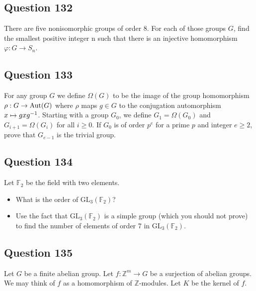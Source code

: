 \documentclass[12pt]{article}
\begin{document}
\hypertarget{question-132}{%
\subsection{Question 132}\label{question-132}}

There are five nonisomorphic groups of order 8. For each of those groups
\(G\), find the smallest positive integer n such that there is an
injective homomorphism \(\varphi: G\rightarrow S_n\).

\hypertarget{question-133}{%
\subsection{Question 133}\label{question-133}}

For any group \(G\) we define \(\Omega(G)\) to be the image of the group
homomorphism \(\rho:G\rightarrow{\text{Aut}}(G)\) where \(\rho\) maps \(g\in G\)
to the conjugation automorphism \(x\mapsto gxg^{-1}\). Starting with a
group \(G_0\), we define \(G_1=\Omega(G_0)\) and \(G_{i+1}=\Omega(G_i)\)
for all \(i\geq 0\). If \(G_0\) is of order \(p^e\) for a prime \(p\)
and integer \(e\geq 2\), prove that \(G_{e-1}\) is the trivial group.

\hypertarget{question-134}{%
\subsection{Question 134}\label{question-134}}

Let \(\mathbb F_2\) be the field with two elements.

\begin{itemize}
\item
  What is the order of \(\text{GL}_3(\mathbb F_2)\)?
\item
  Use the fact that \(\text{GL}_3(\mathbb F_2)\) is a simple group
  (which you should not prove) to find the number of elements of order 7
  in \(\text{GL}_3(\mathbb F_2)\).
\end{itemize}

\hypertarget{question-135}{%
\subsection{Question 135}\label{question-135}}

Let \(G\) be a finite abelian group. Let \(f:\mathbb Z^m\rightarrow G\)
be a surjection of abelian groups. We may think of \(f\) as a
homomorphism of \(\mathbb Z\)-modules. Let \(K\) be the kernel of \(f\).
\end{document}
